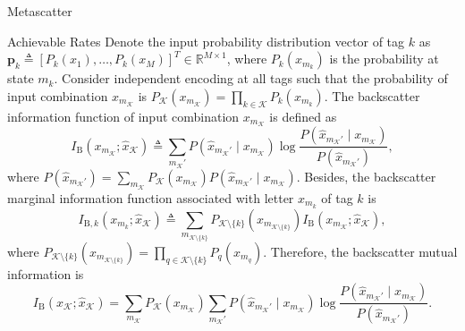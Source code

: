\documentclass[journal]{IEEEtran}
\begin{document}
\begin{section}{Metascatter}
	\begin{subsection}{Achievable Rates}
		Denote the input probability distribution vector of tag $k$ as $\boldsymbol{p}_k \triangleq [P_k(x_1),\ldots,P_k(x_M)]^T \in \mathbb{R}^{M \times 1}$, where $P_k(x_{m_k})$ is the probability at state $m_k$.
		Consider independent encoding at all tags such that the probability of input combination $x_{m_{\mathcal{K}}}$ is $P_{\mathcal{K}}(x_{m_{\mathcal{K}}}) = \prod_{k \in \mathcal{K}} P_k(x_{m_k})$.
		The backscatter information function of input combination $x_{m_{\mathcal{K}}}$ is defined as
		\begin{equation}
			I_{\mathrm{B}}(x_{m_{\mathcal{K}}};\hat{x}_{\mathcal{K}}) \triangleq \sum_{m_{\mathcal{K}}'} P(\hat{x}_{m_{\mathcal{K}}'} \mid x_{m_{\mathcal{K}}}) \log \frac{P(\hat{x}_{m_{\mathcal{K}}'} \mid x_{m_{\mathcal{K}}})}{P(\hat{x}_{m_{\mathcal{K}}'})},
			\label{eq:backscatter_information_function}
		\end{equation}
		where $P(\hat{x}_{m_{\mathcal{K}}'}) = \sum_{m_{\mathcal{K}}} P_{\mathcal{K}}(x_{m_{\mathcal{K}}}) P(\hat{x}_{m_{\mathcal{K}}'} \mid x_{m_{\mathcal{K}}})$.
		Besides, the backscatter marginal information function associated with letter $x_{m_k}$ of tag $k$ is
		\begin{equation}
			I_{\mathrm{B},k}(x_{m_k};\hat{x}_{\mathcal{K}}) \triangleq \sum_{m_{\mathcal{K} \setminus \{k\}}} P_{\mathcal{K} \setminus \{k\}}(x_{m_{\mathcal{K} \setminus \{k\}}}) I_{\mathrm{B}}(x_{m_{\mathcal{K}}};\hat{x}_{\mathcal{K}}),
			\label{eq:backscatter_marginal_information_function}
		\end{equation}
		where $P_{\mathcal{K} \setminus \{k\}}(x_{m_{\mathcal{K} \setminus \{k\}}}) = \prod_{q \in \mathcal{K} \setminus \{k\}} P_{q}(x_{m_{q}})$.
		Therefore, the backscatter mutual information is
		\begin{equation}
			I_{\mathrm{B}}(x_{\mathcal{K}};\hat{x}_{\mathcal{K}}) = \sum_{m_{\mathcal{K}}} P_{\mathcal{K}}(x_{m_{\mathcal{K}}}) \sum_{m_{\mathcal{K}}'} P(\hat{x}_{m_{\mathcal{K}}'} \mid x_{m_{\mathcal{K}}}) \log \frac{P(\hat{x}_{m_{\mathcal{K}}'} \mid x_{m_{\mathcal{K}}})}{P(\hat{x}_{m_{\mathcal{K}}'})}.
			\label{eq:backscatter_mutual_information}
		\end{equation}


\end{subsection}
\end{section}
\end{document}
